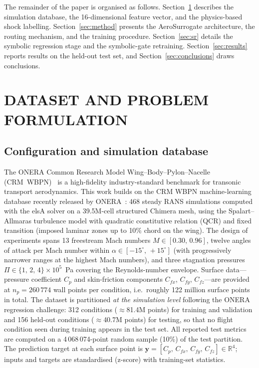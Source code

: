 \documentclass{WCCM-ECCOMAS_2026_Full_Paper}
\begin{document}
The remainder of the paper is organised as follows.
Section~\ref{sec:dataset} describes the simulation database, the
16-dimensional feature vector, and the physics-based shock labelling.
Section~\ref{sec:method} presents the AeroSurrogate architecture, the
routing mechanism, and the training procedure.
Section~\ref{sec:sr} details the symbolic regression stage and the
symbolic-gate retraining.  Section~\ref{sec:results} reports results
on the held-out test set, and Section~\ref{sec:conclusions} draws
conclusions.

\section{DATASET AND PROBLEM FORMULATION}
\label{sec:dataset}

\subsection{Configuration and simulation database}

The ONERA Common Research Model Wing--Body--Pylon--Nacelle
(CRM~WBPN)~\cite{Vassberg2008,Levy2013} is a high-fidelity
industry-standard benchmark for transonic transport aerodynamics.
This work builds on the CRM WBPN machine-learning database recently
released by ONERA~\cite{Peter2025}: 468 steady RANS simulations
computed with the elsA solver on a 39.5M-cell structured Chimera
mesh, using the Spalart--Allmaras turbulence model with quadratic
constitutive relation (QCR) and fixed transition (imposed laminar
zones up to 10\% chord on the wing).  The design of experiments
spans 13 freestream Mach numbers $M \in [0.30,\,0.96]$, twelve
angles of attack per Mach number within
$\alpha \in [-15^{\circ},\,+15^{\circ}]$ (with progressively narrower
ranges at the highest Mach numbers), and three stagnation pressures
$\Pi \in \{1,\,2,\,4\}\times 10^{5}$~Pa covering the Reynolds-number
envelope.  Surface data---pressure coefficient $C_p$ and
skin-friction components $C_{fx}$, $C_{fy}$, $C_{fz}$---are provided
at $n_p = 260\,774$ wall points per condition, i.e.\ roughly 122
million surface points in total.  The dataset is partitioned
\emph{at the simulation level} following the ONERA regression
challenge: 312 conditions ($\approx$81.4M points) for training and
validation and 156 held-out conditions ($\approx$40.7M points) for
testing, so that no flight condition seen during training appears in
the test set.  All reported test metrics are computed on a
4\,068\,074-point random sample (10\%) of the test partition.
The prediction target at each surface point is
$\mathbf{y} = [C_p,\,C_{fx},\,C_{fy},\,C_{fz}] \in \mathbb{R}^{4}$;
inputs and targets are standardised (z-score) with training-set
statistics.
\end{document}
